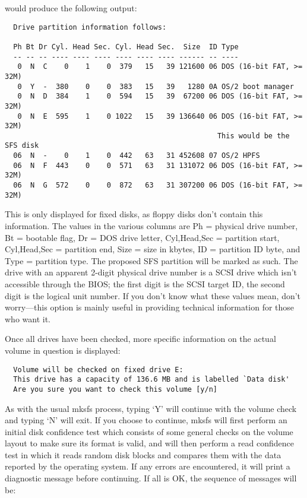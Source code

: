 would produce the following output:
{\small

\begin{verbatim}
  Drive partition information follows:

  Ph Bt Dr Cyl. Head Sec. Cyl. Head Sec.  Size  ID Type
  -- -- -- ---- ---- ---- ---- ---- ---- ------ -- ----
   0  N  C    0    1    0  379   15   39 121600 06 DOS (16-bit FAT, >= 32M)
   0  Y  -  380    0    0  383   15   39   1280 0A OS/2 boot manager
   0  N  D  384    1    0  594   15   39  67200 06 DOS (16-bit FAT, >= 32M)
   0  N  E  595    1    0 1022   15   39 136640 06 DOS (16-bit FAT, >= 32M)
                                                  This would be the SFS disk
  06  N  -    0    1    0  442   63   31 452608 07 OS/2 HPFS
  06  N  F  443    0    0  571   63   31 131072 06 DOS (16-bit FAT, >= 32M)
  06  N  G  572    0    0  872   63   31 307200 06 DOS (16-bit FAT, >= 32M)
\end{verbatim}

}
This is only displayed for fixed disks, as floppy disks don't contain this 
information.  The values in the various columns are Ph = physical drive number, 
Bt = bootable flag, Dr = DOS drive letter, Cyl,Head,Sec = partition start, 
Cyl,Head,Sec = partition end, Size = size in kbytes, ID = partition ID byte, 
and Type = partition type.  The proposed SFS partition will be marked as such.  
The drive with an apparent \hbox{2-digit} physical drive number is a SCSI drive which
isn't accessible through the BIOS; the first digit is the SCSI target ID, the
second digit is the logical unit number.  If you don't know what these values 
mean, don't worry---this option is mainly useful in providing technical 
information for those who want it.

Once all drives have been checked, more specific information on the actual
volume in question is displayed:

\begin{verbatim}
  Volume will be checked on fixed drive E:
  This drive has a capacity of 136.6 MB and is labelled `Data disk'
  Are you sure you want to check this volume [y/n]
\end{verbatim}

As with the usual mksfs process, typing `Y' will continue with the volume check
and typing `N' will exit.  If you choose to continue, mksfs will first perform
an initial disk confidence test which consists of some general checks on the
volume layout to make sure its format is valid, and will then perform a read
confidence test in which it reads random disk blocks and compares them with the
data reported by the operating system.  If any errors are encountered, it will
print a diagnostic message before continuing.  If all is OK, the sequence of
messages will be:

